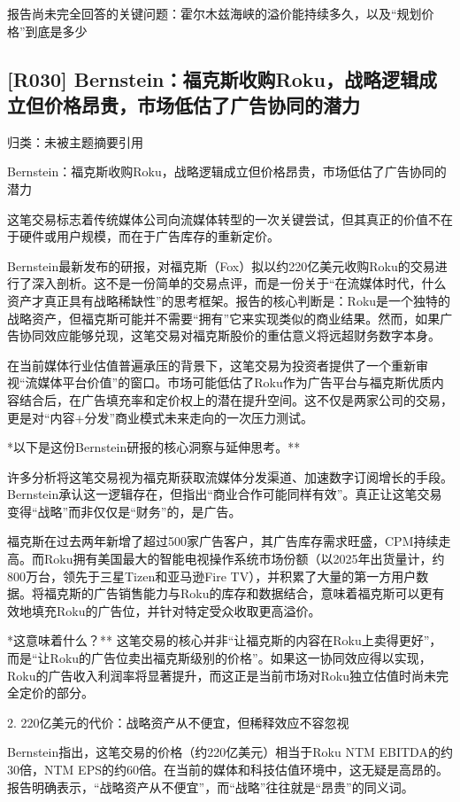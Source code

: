\documentclass[11pt]{ctexart}
\begin{document}
报告尚未完全回答的关键问题：霍尔木兹海峡的溢价能持续多久，以及“规划价格”到底是多少

\subsection{[R030] Bernstein：福克斯收购Roku，战略逻辑成立但价格昂贵，市场低估了广告协同的潜力}
{\small\color{refgray}归类：未被主题摘要引用}

Bernstein：福克斯收购Roku，战略逻辑成立但价格昂贵，市场低估了广告协同的潜力

这笔交易标志着传统媒体公司向流媒体转型的一次关键尝试，但其真正的价值不在于硬件或用户规模，而在于广告库存的重新定价。

Bernstein最新发布的研报，对福克斯（Fox）拟以约220亿美元收购Roku的交易进行了深入剖析。这不是一份简单的交易点评，而是一份关于“在流媒体时代，什么资产才真正具有战略稀缺性”的思考框架。报告的核心判断是：Roku是一个独特的战略资产，但福克斯可能并不需要“拥有”它来实现类似的商业结果。然而，如果广告协同效应能够兑现，这笔交易对福克斯股价的重估意义将远超财务数字本身。

在当前媒体行业估值普遍承压的背景下，这笔交易为投资者提供了一个重新审视“流媒体平台价值”的窗口。市场可能低估了Roku作为广告平台与福克斯优质内容结合后，在广告填充率和定价权上的潜在提升空间。这不仅是两家公司的交易，更是对“内容+分发”商业模式未来走向的一次压力测试。

*以下是这份Bernstein研报的核心洞察与延伸思考。**

许多分析将这笔交易视为福克斯获取流媒体分发渠道、加速数字订阅增长的手段。Bernstein承认这一逻辑存在，但指出“商业合作可能同样有效”。真正让这笔交易变得“战略”而非仅仅是“财务”的，是广告。

福克斯在过去两年新增了超过500家广告客户，其广告库存需求旺盛，CPM持续走高。而Roku拥有美国最大的智能电视操作系统市场份额（以2025年出货量计，约800万台，领先于三星Tizen和亚马逊Fire TV），并积累了大量的第一方用户数据。将福克斯的广告销售能力与Roku的库存和数据结合，意味着福克斯可以更有效地填充Roku的广告位，并针对特定受众收取更高溢价。

*这意味着什么？** 这笔交易的核心并非“让福克斯的内容在Roku上卖得更好”，而是“让Roku的广告位卖出福克斯级别的价格”。如果这一协同效应得以实现，Roku的广告收入利润率将显著提升，而这正是当前市场对Roku独立估值时尚未完全定价的部分。

2. 220亿美元的代价：战略资产从不便宜，但稀释效应不容忽视

Bernstein指出，这笔交易的价格（约220亿美元）相当于Roku NTM EBITDA的约30倍，NTM EPS的约60倍。在当前的媒体和科技估值环境中，这无疑是高昂的。报告明确表示，“战略资产从不便宜”，而“战略”往往就是“昂贵”的同义词。
\end{document}
